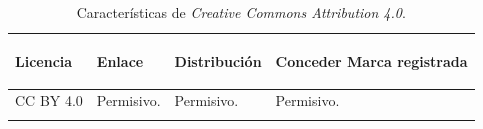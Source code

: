 \begin{longtable}[]{@{}llll@{}} 
\toprule \label{ccaresumetable}
\begin{minipage}[b]{0.15\columnwidth}\raggedright\strut
Licencia\strut
\end{minipage} & \begin{minipage}[b]{0.15\columnwidth}\raggedright\strut
Enlace\strut
\end{minipage} & \begin{minipage}[b]{0.20\columnwidth}\raggedright\strut
Distribución\strut
\end{minipage} & \begin{minipage}[b]{0.36\columnwidth}\raggedright\strut
Conceder Marca registrada\strut
\end{minipage}\tabularnewline
\midrule
\endhead
\begin{minipage}[t]{0.15\columnwidth}\raggedright\strut
CC BY 4.0\strut
\end{minipage} & \begin{minipage}[t]{0.15\columnwidth}\raggedright\strut
Permisivo.\strut
\end{minipage} & \begin{minipage}[t]{0.20\columnwidth}\raggedright\strut
Permisivo.\strut
\end{minipage} & \begin{minipage}[t]{0.36\columnwidth}\raggedright\strut
Permisivo.\strut
\end{minipage}\tabularnewline
\bottomrule
\caption{Características de \textit{Creative Commons Attribution 4.0}.}
\end{longtable}

